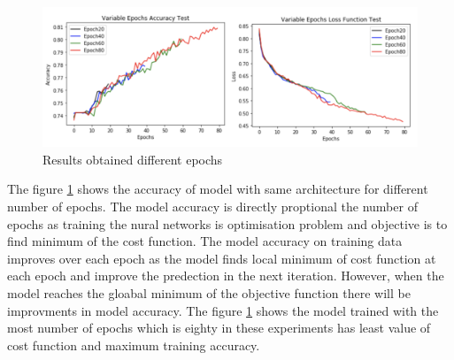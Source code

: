 \begin{figure}[!htp]
    \includegraphics[width=\textwidth]{Images/epochs.png}
    \caption{Results obtained different epochs}
    \label{fig:epochsTest}
\end{figure}

The figure \ref{fig:epochsTest} shows the accuracy of model with same architecture for 
different number of epochs. The model accuracy is directly proptional the number of epochs as 
training the nural networks is optimisation problem and objective is to find minimum of the cost 
function. The model accuracy on training data improves over each epoch as the model finds 
local minimum of cost function at each epoch and improve the predection in the next iteration.
However, when the model reaches the gloabal minimum of the objective function there will 
be improvments in model accuracy. The figure \ref{fig:epochsTest} shows the model trained 
with the most number of epochs which is eighty in these experiments has least value of 
cost function and maximum training accuracy.